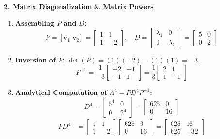 \textbf{2. Matrix Diagonalization \& Matrix Powers}
\begin{enumerate}
    \item \textbf{Assembling $P$ and $D$:}
    \begin{equation*}
    P = [\mathbf{v}_1 \; \mathbf{v}_2] = \begin{bmatrix} 1 & 1 \\ 1 & -2 \end{bmatrix}, \quad D = \begin{bmatrix} \lambda_1 & 0 \\ 0 & \lambda_2 \end{bmatrix} = \begin{bmatrix} 5 & 0 \\ 0 & 2 \end{bmatrix}
    \end{equation*}
    \item \textbf{Inversion of $P$:}
    $\det(P) = (1)(-2) - (1)(1) = -3$.
    \begin{equation*}
    P^{-1} = \frac{1}{-3} \begin{bmatrix} -2 & -1 \\ -1 & 1 \end{bmatrix} = \frac{1}{3} \begin{bmatrix} 2 & 1 \\ 1 & -1 \end{bmatrix}
    \end{equation*}
    \item \textbf{Analytical Computation of $A^4 = P D^4 P^{-1}$:}
    \begin{equation*}
    D^4 = \begin{bmatrix} 5^4 & 0 \\ 0 & 2^4 \end{bmatrix} = \begin{bmatrix} 625 & 0 \\ 0 & 16 \end{bmatrix}
    \end{equation*}
    \begin{align*}
    P D^4 &= \begin{bmatrix} 1 & 1 \\ 1 & -2 \end{bmatrix} \begin{bmatrix} 625 & 0 \\ 0 & 16 \end{bmatrix} = \begin{bmatrix} 625 & 16 \\ 625 & -32 \end{bmatrix} \\

\end{align*}
\end{enumerate}
